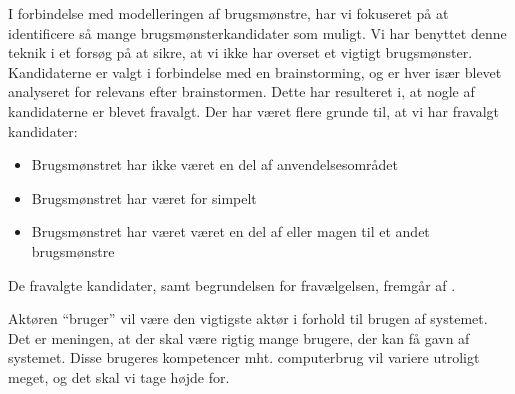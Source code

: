 I forbindelse med modelleringen af brugsmønstre, har vi fokuseret på at identificere så mange brugsmønsterkandidater som muligt. Vi har benyttet denne teknik i et forsøg på at sikre, at vi ikke har overset et vigtigt brugsmønster. Kandidaterne er valgt i forbindelse med en brainstorming, og er hver især blevet analyseret for relevans efter brainstormen. Dette har resulteret i, at nogle af kandidaterne er blevet fravalgt. Der har været flere grunde til, at vi har fravalgt kandidater:

\begin{itemize}[noitemsep]
\item Brugsmønstret har ikke været en del af anvendelsesområdet
\item Brugsmønstret har været for simpelt
\item Brugsmønstret har været været en del af eller magen til et andet brugsmønstre
\end{itemize}

De fravalgte kandidater, samt begrundelsen for fravælgelsen, fremgår af .

Aktøren ``bruger'' vil være den vigtigste aktør i forhold til brugen af systemet. Det er meningen, at der skal være rigtig mange brugere, der kan få gavn af systemet. Disse brugeres kompetencer mht. computerbrug vil variere utroligt meget, og det skal vi tage højde for.


